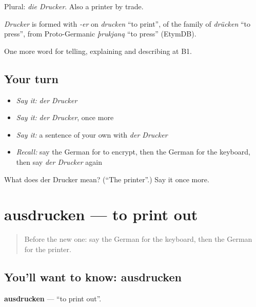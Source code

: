 Plural: \emph{die Drucker}. Also a printer by trade.

\begin{cousinweb}
\emph{Drucker} is formed with \emph{-er} on \emph{drucken} \textquotedblleft{}to print\textquotedblright{}, of the family of \emph{drücken} \textquotedblleft{}to press\textquotedblright{}, from Proto-Germanic \emph{þrukjaną} \textquotedblleft{}to press\textquotedblright{} (EtymDB).
\end{cousinweb}

\begin{grammarlens}[title={What you've built}]
One more word for telling, explaining and describing at B1.
\end{grammarlens}

\subsection*{Your turn}
\begin{itemize}
\raggedright
  \item \emph{Say it:} \emph{der Drucker}
  \item \emph{Say it:} \emph{der Drucker}, once more
  \item \emph{Say it:} a sentence of your own with \emph{der Drucker}
  \item \emph{Recall:} say the German for to encrypt, then the German for the keyboard, then say \emph{der Drucker} again
\end{itemize}

\begin{tcolorbox}[breakable,colback=teal!4,colframe=teal!35!black,title={Before you move on}]
What does der Drucker mean? (\textquotedblleft{}The printer\textquotedblright{}.) Say it once more.
\end{tcolorbox}
\section[ausdrucken]{ausdrucken — to print out}

\label{lesson:GE-C396-ausdrucken}



\begin{quote}
Before the new one: say the German for the keyboard, then the German for the printer.
\end{quote}

\subsection*{You'll want to know: ausdrucken}
\textbf{ausdrucken} — \textquotedblleft{}to print out\textquotedblright{}.

